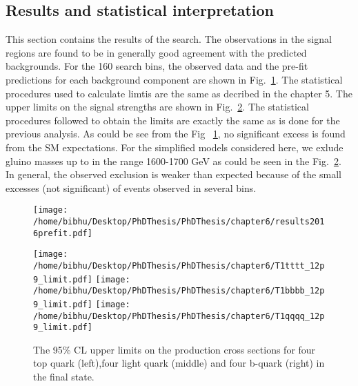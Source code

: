 \subsection{Results and statistical interpretation}
This section contains the results of the search. The observations in the signal regions are found to be in 
generally good agreement with the predicted backgrounds. For the 160
search bins, the observed data and the pre-fit predictions for each background
component are shown in Fig.~\ref{fig:DataVsBkg2016}. The statistical procedures used to calculate limtis are the same as decribed in the chapter 5. The upper limits on the signal strengths are shown in Fig.~\ref{fig:Limit2016}. The statistical procedures followed to obtain the limits are exactly the same as is done for the previous analysis. As could be see from the Fig ~\ref{fig:DataVsBkg2016}, no significant excess is found from the SM expectations. For the simplified models considered here, we exlude gluino masses up to in the range 1600-1700 GeV as could be seen in the Fig.~\ref{fig:Limit2016}. In general, the observed exclusion is weaker than expected because of the small excesses (not significant) of events observed in several bins. 

\begin{figure}[h]
\centering
\texttt{[image: /home/bibhu/Desktop/PhDThesis/PhDThesis/chapter6/results2016prefit.pdf]}
\caption{\label{fig:DataVsBkg2016} }
\end{figure}



\begin{figure}[h]
\centering
\texttt{[image: /home/bibhu/Desktop/PhDThesis/PhDThesis/chapter6/T1tttt\_12p9\_limit.pdf]}
\texttt{[image: /home/bibhu/Desktop/PhDThesis/PhDThesis/chapter6/T1bbbb\_12p9\_limit.pdf]}
\texttt{[image: /home/bibhu/Desktop/PhDThesis/PhDThesis/chapter6/T1qqqq\_12p9\_limit.pdf]}
\caption{\label{fig:Limit2016}The 95\% CL upper limits on the production cross sections for four top quark (left),four light quark (middle) and four b-quark (right) in the final state. }
\end{figure}










